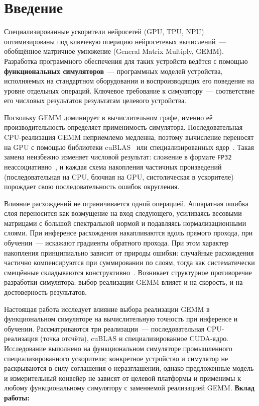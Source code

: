 \section{Введение}
\label{sec:intro}

Специализированные ускорители нейросетей (GPU, TPU, NPU) оптимизированы под
ключевую операцию нейросетевых вычислений~--- обобщённое матричное умножение
(General Matrix Multiply, GEMM). Разработка программного обеспечения для таких
устройств ведётся с помощью \textbf{функциональных симуляторов}~--- программных
моделей устройства, исполняемых на стандартном оборудовании и воспроизводящих
его поведение на уровне отдельных операций. Ключевое требование к симулятору~---
соответствие его числовых результатов результатам целевого устройства.

Поскольку GEMM доминирует в вычислительном графе, именно её производительность
определяет применимость симулятора. Последовательная CPU-реализация GEMM
неприемлемо медленна, поэтому вычисление переносят на GPU с помощью библиотеки
cuBLAS~\cite{cuBLAS2024} или специализированных ядер~\cite{CUDA2024}. Такая
замена неизбежно изменяет числовой результат: сложение в формате
\texttt{FP32} неассоциативно~\cite{Higham2002,Goldberg1991}, и каждая схема
накопления частичных произведений (последовательная на CPU, блочная на GPU,
систолическая в ускорителе) порождает свою последовательность ошибок округления.

Влияние расхождений не ограничивается одной операцией. Аппаратная ошибка слоя
переносится как возмущение на вход следующего, усиливаясь весовыми матрицами с
большой спектральной нормой и подавляясь нормализационными слоями. При инференсе
расхождения накапливаются вдоль прямого прохода, при обучении~--- искажают
градиенты обратного прохода. При этом характер накопления принципиально зависит
от природы ошибки: случайные расхождения частично компенсируются при
суммировании по слоям, тогда как систематически смещённые складываются
конструктивно~\cite{Higham2002}. Возникает структурное противоречие
разработки симулятора: выбор реализации GEMM влияет и на скорость, и на
достоверность результатов.

Настоящая работа исследует влияние выбора реализации GEMM в функциональном
симуляторе на вычислительную точность при инференсе и обучении. Рассматриваются
три реализации~--- последовательная CPU-реализация (точка отсчёта), cuBLAS и
специализированное CUDA-ядро. Исследование выполнено на функциональном симуляторе
промышленного специализированного ускорителя; конкретное устройство и симулятор
не раскрываются в силу соглашения о неразглашении, однако предложенные модель и
измерительный конвейер не зависят от целевой платформы и применимы к любому
функциональному симулятору с заменяемой реализацией GEMM. \textbf{Вклад работы:}

